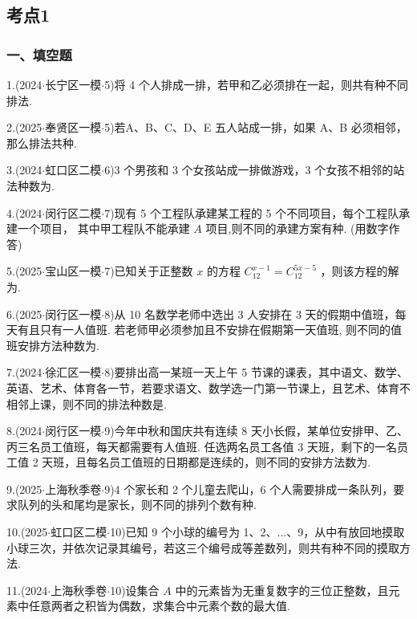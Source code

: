 \subsection*{考点1}

\subsubsection*{一、填空题}

1.(2024$\cdot$长宁区一模$\cdot$5)将 4 个人排成一排，若甲和乙必须排在一起，则共有\blkda[2]{}种不同排法.

2.(2025$\cdot$奉贤区一模$\cdot$5)若A、B、C、D、E 五人站成一排，如果 A、B 必须相邻，那么排法共\blkda[2]{}种.

3.(2024$\cdot$虹口区二模$\cdot$6)3 个男孩和 3 个女孩站成一排做游戏，3 个女孩不相邻的站法种数为\blkda[2]{}.

4.(2024$\cdot$闵行区二模$\cdot$7)现有 5 个工程队承建某工程的 5 个不同项目，每个工程队承建一个项目， 其中甲工程队不能承建 $A$ 项目,则不同的承建方案有\blkda[2]{}种. (用数字作答)

5.(2025$\cdot$宝山区一模$\cdot$7)已知关于正整数 $x$ 的方程 ${{C}}_{12}^{x - 1} = {{C}}_{12}^{{5x} - 5}$ ，则该方程的解为\blkda[2]{}.

6.(2025$\cdot$闵行区一模$\cdot$8)从 10 名数学老师中选出 3 人安排在 3 天的假期中值班，每天有且只有一人值班. 若老师甲必须参加且不安排在假期第一天值班, 则不同的值班安排方法种数为\blkda[2]{}.

7.(2024$\cdot$徐汇区一模$\cdot$8)要排出高一某班一天上午 5 节课的课表，其中语文、数学、英语、艺术、体育各一节，若要求语文、数学选一门第一节课上，且艺术、体育不相邻上课，则不同的排法种数是\blkda[2]{}.

8.(2024$\cdot$闵行区一模$\cdot$9)今年中秋和国庆共有连续 8 天小长假，某单位安排甲、乙、丙三名员工值班，每天都需要有人值班. 任选两名员工各值 3 天班，剩下的一名员工值 2 天班，且每名员工值班的日期都是连续的，则不同的安排方法数为\blkda[2]{}.

9.(2025$\cdot$上海秋季卷$\cdot$9)4 个家长和 2 个儿童去爬山，6 个人需要排成一条队列，要求队列的头和尾均是家长，则不同的排列个数有\blkda[2]{}种.

10.(2025$\cdot$虹口区二模$\cdot$10)已知 9 个小球的编号为 1、2、...、9，从中有放回地摸取小球三次，并依次记录其编号，若这三个编号成等差数列，则共有\blkda[2]{}种不同的摸取方法.

11.(2024$\cdot$上海秋季卷$\cdot$10)设集合 $A$ 中的元素皆为无重复数字的三位正整数，且元素中任意两者之积皆为偶数，求集合中元素个数的最大值\blkda[2]{}.

